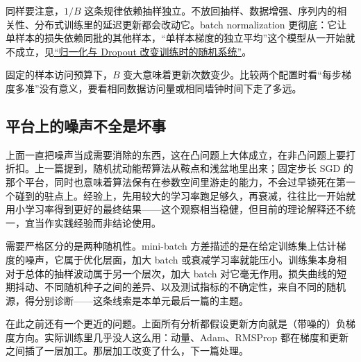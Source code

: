 同样要注意，\(1/B\) 这条规律依赖抽样独立。不放回抽样、数据增强、序列内的相关性、分布式训练里的延迟更新都会改动它。batch normalization 更彻底：它让单样本的损失依赖同批的其他样本，``单样本梯度的独立平均''这个模型从一开始就不成立，见\hyperref[sec:14-Deep-Learning/03-Optimization-and-Training/03]{``归一化与 Dropout 改变训练时的随机系统''}。

固定的样本访问预算下，\(B\) 变大意味着更新次数变少。比较两个配置时看``每步梯度多准''没有意义，要看相同数据访问量或相同墙钟时间下走了多远。

\subsection{平台上的噪声不全是坏事}

上面一直把噪声当成需要消除的东西，这在凸问题上大体成立，在非凸问题上要打折扣。上一篇提到，随机扰动能帮算法从鞍点和浅盆地里出来；固定步长 SGD 的那个平台，同时也意味着算法保有在参数空间里游走的能力，不会过早锁死在第一个碰到的驻点上。经验上，先用较大的学习率跑足够久，再衰减，往往比一开始就用小学习率得到更好的最终结果——这个观察相当稳健，但目前的理论解释还不统一，宜当作实践经验而非结论使用。

需要严格区分的是两种随机性。mini-batch 方差描述的是在给定训练集上估计梯度的噪声，它属于优化层面，加大 batch 或衰减学习率就能压小。训练集本身相对于总体的抽样波动属于另一个层次，加大 batch 对它毫无作用。损失曲线的短期抖动、不同随机种子之间的差异、以及测试指标的不确定性，来自不同的随机源，得分别诊断——这条线索是本单元最后一篇的主题。

在此之前还有一个更近的问题。上面所有分析都假设更新方向就是（带噪的）负梯度方向。实际训练里几乎没人这么用：动量、Adam、RMSProp 都在梯度和更新之间插了一层加工。那层加工改变了什么，下一篇处理。
